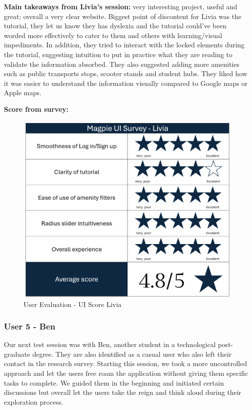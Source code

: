 \noindent\textbf{Main takeaways from Livia's session: }very interesting project,
useful and great; overall a very clear website. Biggest point of discontent for
Livia was the tutorial, they let us know they has dyslexia and the tutorial
could've been worded more effectively to cater to them and others with
learning/visual impediments. In addition, they tried to interact with the locked
elements during the tutorial, suggesting intuition to put in practice what they
are reading to validate the information absorbed. They also suggested adding
more amenities such as public transports stops, scooter stands and student hubs.
They liked how it was easier to understand the information visually compared to
Google maps or Apple maps.

\newpage{}

\textbf{Score from survey: }

\begin{figure}[h!]
    \centering
    \includegraphics[width=\textwidth]{images/survey-livia.png}
    \caption{User Evaluation - UI Score Livia}
\end{figure}

\newpage{}

\subsubsection{User 5 - Ben}
Our next test session was with Ben, another student in a technological
post-graduate degree. They are also identified as a casual user who also left
their contact in the research survey. Starting this session, we took a more
uncontrolled approach and let the users free roam the application without giving
them specific tasks to complete. We guided them in the beginning and initiated
certain discussions but overall let the users take the reign and think aloud
during their exploration process.

